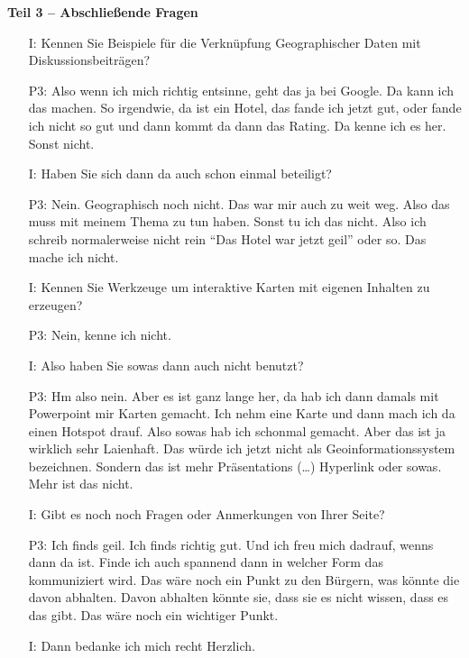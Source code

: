 \textbf{Teil 3 -- Abschlie{\ss}ende Fragen}
\begin{itemize}
    \item[I:] Kennen Sie Beispiele f{\"u}r die Verkn{\"u}pfung Geographischer Daten mit Diskussionsbeitr{\"a}gen?
    \item[P3:] Also wenn ich mich richtig entsinne, geht das ja bei Google. Da kann ich das machen. So irgendwie, da ist ein Hotel, das fande ich jetzt gut, oder fande ich nicht so gut und dann kommt da dann das Rating. Da kenne ich es her. Sonst nicht.
    \item[I:] Haben Sie sich dann da auch schon einmal beteiligt?
    \item[P3:] Nein. Geographisch noch nicht. Das war mir auch zu weit weg. Also das muss mit meinem Thema zu tun haben. Sonst tu ich das nicht. Also ich schreib normalerweise nicht rein "`Das Hotel war jetzt geil"' oder so. Das mache ich nicht.
    \item[I:] Kennen Sie Werkzeuge um interaktive Karten mit eigenen Inhalten zu erzeugen?
    \item[P3:] Nein, kenne ich nicht.
    \item[I:] Also haben Sie sowas dann auch nicht benutzt?
    \item[P3:] Hm also nein. Aber es ist ganz lange her, da hab ich dann damals mit Powerpoint mir Karten gemacht. Ich nehm eine Karte und dann mach ich da einen Hotspot drauf. Also sowas hab ich schonmal gemacht. Aber das ist ja wirklich sehr Laienhaft. Das w{\"u}rde ich jetzt nicht als Geoinformationssystem bezeichnen. Sondern das ist mehr Pr{\"a}sentations (\dots) Hyperlink oder sowas. Mehr ist das nicht.
    \item[I:] Gibt es noch noch Fragen oder Anmerkungen von Ihrer Seite?
    \item[P3:] Ich finds geil. Ich finds richtig gut. Und ich freu mich dadrauf, wenns dann da ist. Finde ich auch spannend dann in welcher Form das kommuniziert wird. Das w{\"a}re noch ein Punkt zu den B{\"u}rgern, was k{\"o}nnte die davon abhalten. Davon abhalten k{\"o}nnte sie, dass sie es nicht wissen, dass es das gibt. Das w{\"a}re noch ein wichtiger Punkt.
    \item[I:] Dann bedanke ich mich recht Herzlich.
\end{itemize}